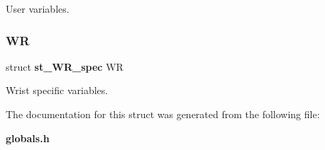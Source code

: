User variables. \mbox{\label{structst__eeprom_a4f0a31122e3554adf793904b9fd98576}} 
\subsubsection{WR}
{\footnotesize\ttfamily struct \textbf{ st\+\_\+\+W\+R\+\_\+spec} WR}

Wrist specific variables. 

The documentation for this struct was generated from the following file\+:\begin{DoxyCompactItemize}
\item 
\textbf{ globals.\+h}\end{DoxyCompactItemize}
